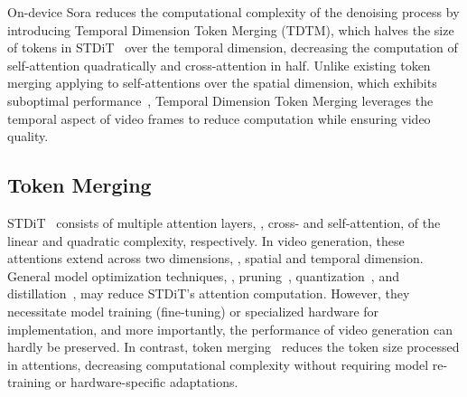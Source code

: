 On-device Sora reduces the computational complexity of the denoising process by introducing Temporal Dimension Token Merging (TDTM), which halves the size of tokens in STDiT~\cite{opensora} over the temporal dimension, decreasing the computation of self-attention quadratically and cross-attention in half. Unlike existing token merging applying to self-attentions over the spatial dimension, which exhibits suboptimal performance~\cite{bolya2022token,bolya2023token,feng2023efficient,li2024vidtome}, Temporal Dimension Token Merging leverages the temporal aspect of video frames to reduce computation while ensuring video quality.



\subsection{Token Merging}

STDiT~\cite{opensora} consists of multiple attention layers, \ie, cross- and self-attention, of the linear and quadratic complexity, respectively. In video generation, these attentions extend across two dimensions, \ie, spatial and temporal dimension. General model optimization techniques, \eg, pruning~\cite{reed1993pruning}, quantization~\cite{gray1998quantization}, and distillation~\cite{hinton2015distilling}, may reduce STDiT's attention computation. However, they necessitate model training (fine-tuning) or specialized hardware for implementation, and more importantly, the performance of video generation can hardly be preserved. In contrast, token merging~\cite{bolya2023token} reduces the token size processed in attentions, decreasing computational complexity without requiring model re-training or hardware-specific adaptations.

